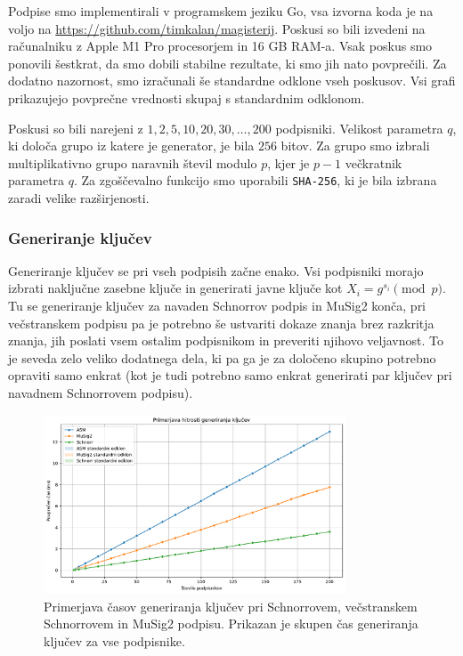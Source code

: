 \documentclass[isrm2, tisk]{fmfdelo}
\begin{document}
Podpise smo implementirali v programskem jeziku Go, vsa izvorna koda je na voljo na
\href{https://github.com/timkalan/magisterij}{https://github.com/timkalan/magisterij}. Poskusi so
bili izvedeni na računalniku z Apple M1 Pro procesorjem in 16 GB RAM-a. Vsak poskus smo ponovili
šestkrat, da smo dobili stabilne rezultate, ki smo jih nato povprečili. Za dodatno nazornost, smo
izračunali še standardne odklone vseh poskusov. Vsi grafi prikazujejo povprečne vrednosti skupaj s
standardnim odklonom.

Poskusi so bili narejeni z $1, 2, 5, 10, 20, 30, \dots, 200$ podpisniki. Velikost parametra $q$, ki
določa grupo iz katere je generator, je bila $256$ bitov. Za grupo smo izbrali multiplikativno grupo
naravnih števil modulo $p$, kjer je $p-1$ večkratnik parametra $q$. Za zgoščevalno funkcijo smo
uporabili \texttt{SHA-256}, ki je bila izbrana zaradi velike razširjenosti.

\subsubsection{Generiranje ključev}
Generiranje ključev se pri vseh podpisih začne enako. Vsi podpisniki morajo izbrati naključne zasebne
ključe in generirati javne ključe kot $X_i = g^{s_i} \pmod p$. Tu se generiranje ključev za navaden
Schnorrov podpis in MuSig2 konča, pri večstranskem podpisu pa je potrebno še ustvariti dokaze znanja brez
razkritja znanja, jih poslati vsem ostalim podpisnikom in preveriti njihovo veljavnost. To je seveda
zelo veliko dodatnega dela, ki pa ga je za določeno skupino potrebno opraviti samo enkrat (kot je
tudi potrebno samo enkrat generirati par ključev pri navadnem Schnorrovem podpisu).

\begin{figure}[ht]
  \centering
  \includegraphics[width=0.8\textwidth]{images/benchmark_KeyGeneration.pdf}
  \caption[Generiranje ključev.]{Primerjava časov generiranja ključev pri Schnorrovem, večstranskem
    Schnorrovem in MuSig2 podpisu. Prikazan je skupen čas generiranja ključev za vse podpisnike.}
  \label{fig:generiranje}
\end{figure}
\end{document}

